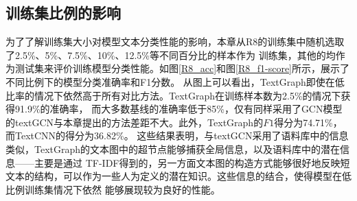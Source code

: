 \subsection{训练集比例的影响}
为了了解训练集大小对模型文本分类性能的影响，本章从R8的训练集中随机选取了2.5\%、5\%、7.5\%、10\%、12.5\%等不同百分比的样本作为
训练集，其他的均作为测试集来评价训练模型分类性能。如图\ref{R8_acc}和图\ref{R8_f1-score}所示，展示了不同比例下的模型分类准确率和F1分数。
从图上可以看出，TextGraph即使在低比率的情况下依然高于所有对比方法。TextGraph在训练样本数为2.5\%的情况下获得91.9\%的准确率，
而大多数基线的准确率低于85\%，仅有同样采用了GCN模型的textGCN与本章提出的方法差距不大。此外，TextGraph的$F1$得分为74.71\%，而TextCNN的得分为36.82\%。
这些结果表明，与textGCN采用了语料库中的信息类似，TextGraph的文本图中的超节点能够捕获全局信息，以及语料库中的潜在信息——主要是通过
TF-IDF得到的，另一方面文本图的构造方式能够很好地反映短文本的结构，可以作为一些人为定义的潜在知识。这些信息的结合，使得模型在低比例训练集情况下依然
能够展现较为良好的性能。

